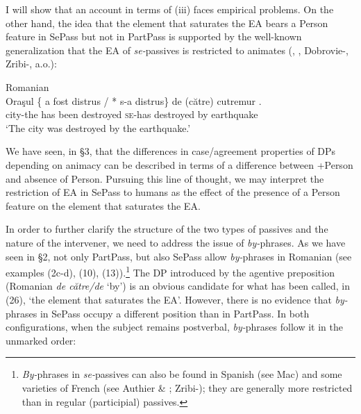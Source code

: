 \documentclass[output=paper]{langsci/langscibook}
\begin{document}
  I will show that an account in terms of (iii) faces empirical problems. On the other hand, the idea that the element that saturates the EA bears a Person feature in SePass but not in PartPass is supported by the well-known generalization that the EA of \textit{se-}passives is restricted to animates (\citealt{Burzio1994}, \citealt{Cornilescu1998}, Dobrovie-\citealt{Sorin2017}, Zribi-\citealt{Hertz2008}, a.o.):

\ea%
         Romanian   \label{ex:giurgea:28}\\
    \gll Oraşul \{ a    fost  distrus      / * s-a      distrus\}   de (către) cutremur  .\\
         city-the  has been destroyed    \textsc{se-}has destroyed by            earthquake\\
    \glt ‘The city was destroyed by the earthquake.’
    \z

          

We have seen, in §3, that the differences in case/agreement properties of DPs depending on animacy can be described in terms of a difference between +Person and absence of Person. Pursuing this line of thought, we may interpret the restriction of EA in SePass to humans as the effect of the presence of a Person feature on the element that saturates the EA.

  In order to further clarify the structure of the two types of passives and the nature of the intervener, we need to address the issue of \textit{by-}phrases. As we have seen in §2, not only PartPass, but also SePass allow \textit{by-}phrases in Romanian (see examples (2c-d), (10), (13)).\footnote{\textit{By-}phrases in \textit{se-}passives can also be found in Spanish (see Mac\citealt{Donald2016}) and some varieties of French (see Authier \& \citealt{Reed1996}; Zribi-\citealt{Hertz2008}); they are generally more restricted than in regular (participial) passives.}  The DP introduced by the agentive preposition (Romanian \textit{de către/de} ‘by’) is an obvious candidate for what has been called, in (26), ‘the element that saturates the EA’. However, there is no evidence that \textit{by-}phrases in SePass occupy a different position than in PartPass. In both configurations, when the subject remains postverbal, \textit{by-}phrases follow it in the unmarked order: 
\end{document}
